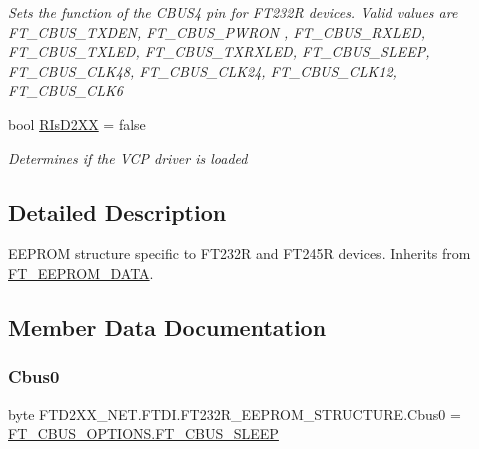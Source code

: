 \begin{DoxyCompactItemize}
\begin{DoxyCompactList}\small\item\em Sets the function of the C\+B\+U\+S4 pin for F\+T232R devices. Valid values are F\+T\+\_\+\+C\+B\+U\+S\+\_\+\+T\+X\+D\+EN, F\+T\+\_\+\+C\+B\+U\+S\+\_\+\+P\+W\+R\+ON , F\+T\+\_\+\+C\+B\+U\+S\+\_\+\+R\+X\+L\+ED, F\+T\+\_\+\+C\+B\+U\+S\+\_\+\+T\+X\+L\+ED, F\+T\+\_\+\+C\+B\+U\+S\+\_\+\+T\+X\+R\+X\+L\+ED, F\+T\+\_\+\+C\+B\+U\+S\+\_\+\+S\+L\+E\+EP, F\+T\+\_\+\+C\+B\+U\+S\+\_\+\+C\+L\+K48, F\+T\+\_\+\+C\+B\+U\+S\+\_\+\+C\+L\+K24, F\+T\+\_\+\+C\+B\+U\+S\+\_\+\+C\+L\+K12, F\+T\+\_\+\+C\+B\+U\+S\+\_\+\+C\+L\+K6 \end{DoxyCompactList}\item 
bool \mbox{\hyperlink{class_f_t_d2_x_x___n_e_t_1_1_f_t_d_i_1_1_f_t232_r___e_e_p_r_o_m___s_t_r_u_c_t_u_r_e_a078d4d994a2424e951d0c840cd19e575}{R\+Is\+D2\+XX}} = false
\begin{DoxyCompactList}\small\item\em Determines if the V\+CP driver is loaded \end{DoxyCompactList}\end{DoxyCompactItemize}


\subsection{Detailed Description}
E\+E\+P\+R\+OM structure specific to F\+T232R and F\+T245R devices. Inherits from \mbox{\hyperlink{class_f_t_d2_x_x___n_e_t_1_1_f_t_d_i_1_1_f_t___e_e_p_r_o_m___d_a_t_a}{F\+T\+\_\+\+E\+E\+P\+R\+O\+M\+\_\+\+D\+A\+TA}}. 



\subsection{Member Data Documentation}
\mbox{\label{class_f_t_d2_x_x___n_e_t_1_1_f_t_d_i_1_1_f_t232_r___e_e_p_r_o_m___s_t_r_u_c_t_u_r_e_a574c0e9c647cd0ec93799d274f474f17}} 
\subsubsection{\texorpdfstring{Cbus0}{Cbus0}}
{\footnotesize\ttfamily byte F\+T\+D2\+X\+X\+\_\+\+N\+E\+T.\+F\+T\+D\+I.\+F\+T232\+R\+\_\+\+E\+E\+P\+R\+O\+M\+\_\+\+S\+T\+R\+U\+C\+T\+U\+R\+E.\+Cbus0 = \mbox{\hyperlink{class_f_t_d2_x_x___n_e_t_1_1_f_t_d_i_1_1_f_t___c_b_u_s___o_p_t_i_o_n_s_a12ffdb96c52abef0df44530b144b0a80}{F\+T\+\_\+\+C\+B\+U\+S\+\_\+\+O\+P\+T\+I\+O\+N\+S.\+F\+T\+\_\+\+C\+B\+U\+S\+\_\+\+S\+L\+E\+EP}}}



